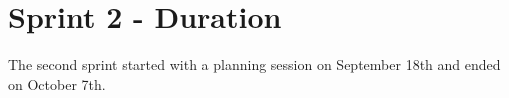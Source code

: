 \section{Sprint 2 - Duration}
The second sprint started with a planning session on September 18th and ended on October 7th. 


